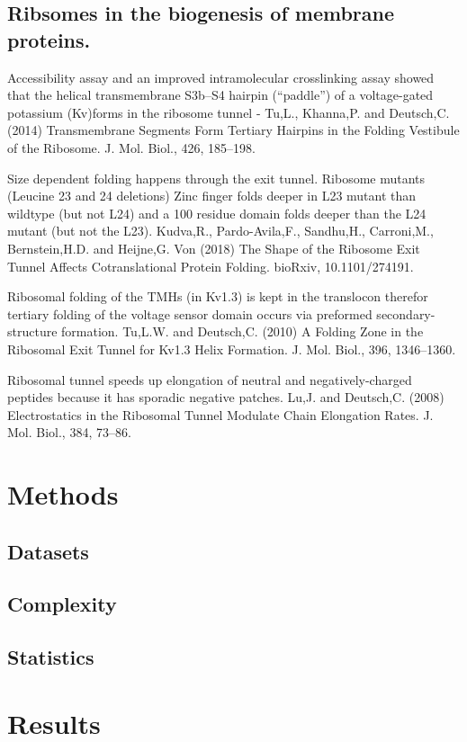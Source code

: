 \subsection{Ribsomes in the biogenesis of membrane proteins.}
Accessibility assay and an improved intramolecular crosslinking assay showed that the helical transmembrane S3b–S4 hairpin (“paddle”) of a voltage-gated potassium (Kv)forms in the ribosome tunnel - Tu,L., Khanna,P. and Deutsch,C. (2014) Transmembrane Segments Form Tertiary Hairpins in the Folding Vestibule of the Ribosome. J. Mol. Biol., 426, 185–198.

 Size dependent folding happens through the exit tunnel. Ribosome mutants (Leucine 23 and 24 deletions) Zinc finger folds deeper in L23 mutant than wildtype (but not L24) and a 100 residue domain folds deeper than the L24 mutant (but not the L23). Kudva,R., Pardo-Avila,F., Sandhu,H., Carroni,M., Bernstein,H.D. and Heijne,G. Von (2018) The Shape of the Ribosome Exit Tunnel Affects Cotranslational Protein Folding. bioRxiv, 10.1101/274191.

Ribosomal folding of the TMHs (in Kv1.3) is kept in the translocon therefor tertiary folding of the voltage sensor domain occurs via preformed secondary-structure formation. Tu,L.W. and Deutsch,C. (2010) A Folding Zone in the Ribosomal Exit Tunnel for Kv1.3 Helix Formation. J. Mol. Biol., 396, 1346–1360.

Ribosomal tunnel speeds up elongation of neutral and negatively-charged peptides because it has sporadic negative patches. Lu,J. and Deutsch,C. (2008) Electrostatics in the Ribosomal Tunnel Modulate Chain Elongation Rates. J. Mol. Biol., 384, 73–86.



\section{Methods}
\subsection{Datasets}
\subsection{Complexity}
\subsection{Statistics}

\section{Results}
